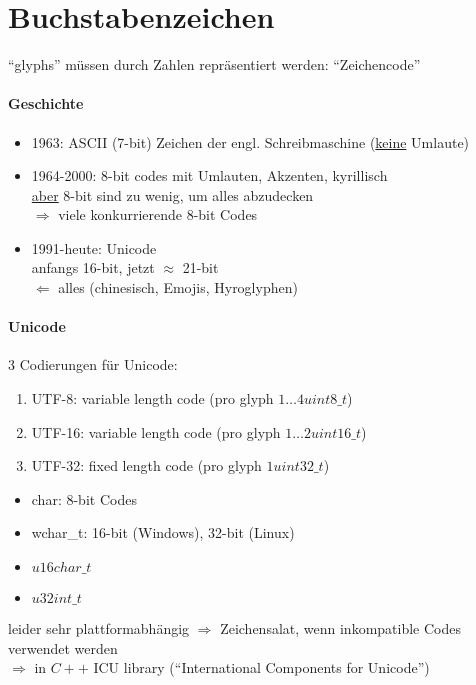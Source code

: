 \documentclass{article}
\begin{document}
	\section{Buchstabenzeichen}
	``glyphs'' müssen durch Zahlen repräsentiert werden: ``Zeichencode''

	\paragraph{Geschichte}
	\begin{itemize}
		\item 1963: ASCII (7-bit) Zeichen der engl. Schreibmaschine (\underline{keine} Umlaute)
		\item 1964-2000: 8-bit codes mit Umlauten, Akzenten, kyrillisch \\
		\underline{aber} 8-bit sind zu wenig, um alles abzudecken \\
		$\Rightarrow$ viele konkurrierende 8-bit Codes
		\item 1991-heute: Unicode \\
		anfangs 16-bit, jetzt $\approx$ 21-bit \\
		$\Leftarrow $ alles (chinesisch, Emojis, Hyroglyphen)
	\end{itemize}

	\paragraph{Unicode}
	$3$ Codierungen für Unicode:
	\begin{enumerate}
		\item UTF-8: variable length code (pro glyph $1 \dots 4 uint8\_t$)
		\item UTF-16: variable length code (pro glyph $1 \dots 2 uint16\_t$)
		\item UTF-32: fixed length code (pro glyph $1 uint32\_t$)
	\end{enumerate}
	\begin{itemize}
		\item char: 8-bit Codes
		\item wchar\_t: 16-bit (Windows), 32-bit (Linux)
		\item $u16char\_t$
		\item $u32int\_t$
	\end{itemize}
	leider sehr plattformabhängig $\Rightarrow $ Zeichensalat, wenn inkompatible Codes verwendet werden \\
	$\Rightarrow $ in $C++$ ICU library (``International Components for Unicode'')
	
\end{document}
